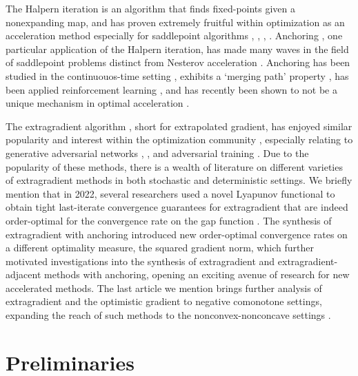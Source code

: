 \documentclass[11pt,reqno,oneside]{amsart}
\theoremstyle{definition}
\numberwithin{equation}{section}
\begin{document}
The Halpern iteration \cite{halpern1967fixed} is an algorithm that finds fixed-points given a nonexpanding map, and has proven extremely fruitful within optimization as an acceleration method especially for saddlepoint algorithms \cite{diakonikolas2020halpern}, \cite{ryu2019ode}, \cite{tran2021halpern}, \cite{tran2022connection}. Anchoring \cite{yoon_ryu}, one particular application of the Halpern iteration, has made many waves in the field of saddlepoint problems distinct from Nesterov acceleration \cite{nesterov1983method_AGM}. Anchoring has been studied in the continuouos-time setting \cite{suh2023continuoustime}, exhibits a `merging path' property \cite{yoon2025flock}, has been applied reinforcement learning \cite{lee2023accelerating}, and has recently been shown to not be a unique mechanism in optimal acceleration \cite{yoon2024notunique}.

The extragradient algorithm \cite{korpelevich1976extragradient}, short for extrapolated gradient, has enjoyed similar popularity and interest within the optimization community \cite{azizian2020tight}, especially relating to generative adversarial networks \cite{liu2019towards}, \cite{chavdarova2019reducing}, and adversarial training \cite{madry2017towards}. 
Due to the popularity of these methods, there is a wealth of literature on different varieties of extragradient methods in both stochastic and deterministic settings. 
We briefly mention that in 2022, several researchers used a novel Lyapunov functional to obtain tight last-iterate convergence guarantees for extragradient \cite{cai2022tightlastiterateconvergenceextragradient} that are indeed order-optimal for the convergence rate on the gap function \cite{golowich}.
The synthesis of extragradient with anchoring \cite{yoon_ryu} introduced new order-optimal convergence rates on a different optimality measure, the squared gradient norm, which further motivated investigations into the synthesis of extragradient and extragradient-adjacent methods \cite{tran2021halpern} with anchoring, opening an exciting avenue of research for new accelerated methods.
The last article we mention brings further analysis of extragradient and the optimistic gradient to negative comonotone settings, expanding the reach of such methods to the nonconvex-nonconcave settings \cite{gorbunov2023convergence}.

\section{Preliminaries}
\end{document}
